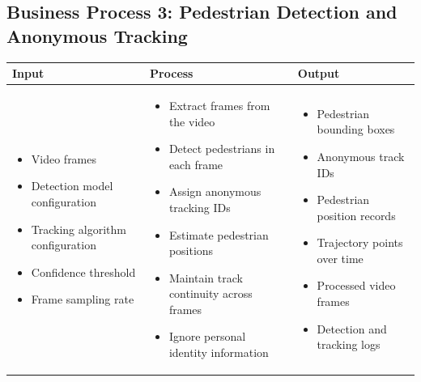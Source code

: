 \documentclass[12pt,a4paper]{report}
\begin{document}
\subsection*{Business Process 3: Pedestrian Detection and Anonymous Tracking}
\begin{longtable}{|p{4.1cm}|p{5.0cm}|p{5.0cm}|}
\hline
\rowcolor{HeaderBlue}
\textbf{Input} & \textbf{Process} & \textbf{Output} \\
\hline

\begin{itemize}[leftmargin=*, nosep]
    \item Video frames
    \item Detection model configuration
    \item Tracking algorithm configuration
    \item Confidence threshold
    \item Frame sampling rate
\end{itemize}
&
\begin{itemize}[leftmargin=*, nosep]
    \item Extract frames from the video
    \item Detect pedestrians in each frame
    \item Assign anonymous tracking IDs
    \item Estimate pedestrian positions
    \item Maintain track continuity across frames
    \item Ignore personal identity information
\end{itemize}
&
\begin{itemize}[leftmargin=*, nosep]
    \item Pedestrian bounding boxes
    \item Anonymous track IDs
    \item Pedestrian position records
    \item Trajectory points over time
    \item Processed video frames
    \item Detection and tracking logs
\end{itemize}
\\
\hline
\end{longtable}
\end{document}
